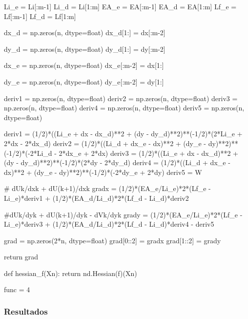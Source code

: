 \documentclass[10pt, a4paper]{article}
\begin{document}
\begin{python}
      Li_e = Li[:m-1]
      Li_d = Li[1:m]
      EA_e = EA[:m-1]
      EA_d = EA[1:m]
      Lf_e = Lf[:m-1]
      Lf_d = Lf[1:m]
      
      dx_d = np.zeros(n, dtype=float)   
      dx_d[1:] = dx[:m-2]
      
      dy_d = np.zeros(n, dtype=float)  
      dy_d[1:] = dy[:m-2]
      
      dx_e = np.zeros(n, dtype=float)
      dx_e[:m-2] = dx[1:]
      
      dy_e = np.zeros(n, dtype=float)
      dy_e[:m-2] = dy[1:]
      
      deriv1 = np.zeros(n, dtype=float)
      deriv2 = np.zeros(n, dtype=float)
      deriv3 = np.zeros(n, dtype=float)
      deriv4 = np.zeros(n, dtype=float)
      deriv5 = np.zeros(n, dtype=float)
        
      deriv1 = (1/2)*((Li_e + dx - dx_d)**2 + (dy - dy_d)**2)**(-1/2)*(2*Li_e + 2*dx - 2*dx_d)        
      deriv2 = (1/2)*((Li_d + dx_e - dx)**2 + (dy_e - dy)**2)**(-1/2)*(-2*Li_d - 2*dx_e + 2*dx)    
      deriv3 = (1/2)*((Li_e + dx - dx_d)**2 + (dy - dy_d)**2)**(-1/2)*(2*dy - 2*dy_d)
      deriv4 = (1/2)*((Li_d + dx_e - dx)**2 + (dy_e - dy)**2)**(-1/2)*(-2*dy_e + 2*dy)
      deriv5 = W    
      
      # dUk/dxk + dU(k+1)/dxk
      gradx = (1/2)*(EA_e/Li_e)*2*(Lf_e - Li_e)*deriv1 + (1/2)*(EA_d/Li_d)*2*(Lf_d - Li_d)*deriv2
      
      #dUk/dyk + dU(k+1)/dyk - dVk/dyk
      grady = (1/2)*(EA_e/Li_e)*2*(Lf_e - Li_e)*deriv3 + (1/2)*(EA_d/Li_d)*2*(Lf_d - Li_d)*deriv4 - deriv5
      
      grad = np.zeros(2*n, dtype=float)
      grad[0::2] = gradx
      grad[1::2] = grady
          
      return grad

  def hessian_f(Xn):
      return nd.Hessian(f)(Xn)

  func = 4

\end{python}


\subsubsection{Resultados}
\end{document}
